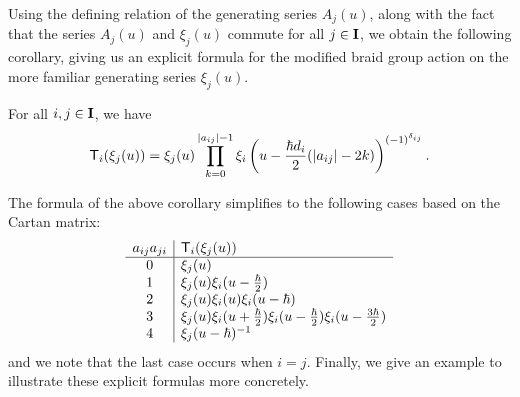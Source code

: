 Using the defining relation of the generating series $A_j(u)$, along with the fact that the series $A_j(u)$ and $\xi_j(u)$ commute for all $j\in\mathbf{I}$, we obtain the following corollary, giving us an explicit formula for the modified braid group action on the more familiar generating series $\xi_j(u)$.

\begin{corollary}\label{C:tau-xi}
    For all $i,j\in\mathbf{I}$, we have
    \[\mathsf{T}_i(\xi_j(u)) = \xi_j(u)\prod_{k=0}^{\lvert a_{ij}\rvert-1} \xi_i\left(u-\frac{\hbar d_i}{2}(\lvert a_{ij}\rvert-2k)\right)^{(-1)^{\delta_{ij}}}.\]
\end{corollary}

The formula of the above corollary simplifies to the following cases based on the Cartan matrix:
\[\begin{array}{c|l}
    a_{ij}a_{ji} & \mathsf{T}_i(\xi_j(u)) \\
    \hline
    0 & \xi_j(u) \\
    1 & \xi_j(u)\xi_i(u-\frac{\hbar}{2}) \\
    2 & \xi_j(u)\xi_i(u)\xi_i(u-\hbar) \\
    3 & \xi_j(u)\xi_i(u+\frac{\hbar}{2})\xi_i(u-\frac{\hbar}{2})\xi_i(u-\frac{3\hbar}{2}) \\
    4 & \xi_j(u-\hbar)^{-1}
\end{array}\]
and we note that the last case occurs when $i=j$.
Finally, we give an example to illustrate these explicit formulas more concretely.

